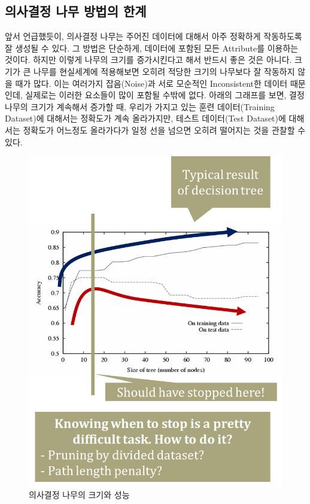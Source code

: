 \documentclass[a4paper]{oblivoir}
\begin{document}
\subsection{의사결정 나무 방법의 한계}
앞서 언급했듯이, 의사결정 나무는 주어진 데이터에 대해서 아주 정확하게 작동하도록 잘 생성될 수 있다. 그 방법은 단순하게, 데이터에 포함된 모든 Attribute를 이용하는 것이다. 하지만 이렇게 나무의 크기를 증가시킨다고 해서 반드시 좋은 것은 아니다. 크기가 큰 나무를 현실세계에 적용해보면 오히려 적당한 크기의 나무보다 잘 작동하지 않을 때가 많다. 이는 여러가지 잡음(Noise)과 서로 모순적인 Inconsistent한 데이터 때문인데, 실제로는 이러한 요소들이 많이 포함될 수밖에 없다. 아래의 그래프를 보면, 결정나무의 크기가 계속해서 증가할 때, 우리가 가지고 있는 훈련 데이터(Training Dataset)에 대해서는 정확도가 계속 올라가지만, 테스트 데이터(Test Dataset)에 대해서는 정확도가 어느정도 올라가다가 일정 선을 넘으면 오히려 떨어지는 것을 관찰할 수 있다.
\begin{figure}[ht]
\centering
\includegraphics[scale=0.6]{Decision_Tree_Weakness.png}
\caption{의사결정 나무의 크기와 성능}
\label{Figure 2-17}
\end{figure}
\end{document}
